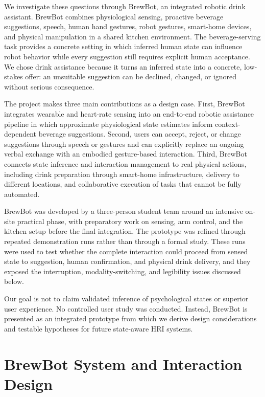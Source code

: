 We investigate these questions through BrewBot, an integrated robotic drink
assistant. BrewBot combines physiological sensing, proactive beverage
suggestions, speech, human hand gestures, robot gestures, smart-home devices,
and physical manipulation in a shared kitchen environment. The beverage-serving
task provides a concrete setting in which inferred human state can influence
robot behavior while every suggestion still requires explicit human acceptance.
We chose drink assistance because it turns an inferred state into a concrete, 
low-stakes offer: an unsuitable suggestion can be declined, changed, or ignored 
without serious consequence.

The project makes three main contributions as a design case. First, BrewBot
integrates wearable and heart-rate sensing into an end-to-end robotic assistance
pipeline in which approximate physiological state estimates inform
context-dependent beverage suggestions. Second, users can accept, reject, or
change suggestions through speech or gestures and can explicitly replace an
ongoing verbal exchange with an embodied gesture-based interaction. Third,
BrewBot connects state inference and interaction management to real physical
actions, including drink preparation through smart-home infrastructure, delivery
to different locations, and collaborative execution of tasks that cannot be
fully automated.

BrewBot was developed by a three-person student team around an intensive
on-site practical phase, with preparatory work on sensing, arm control, and the
kitchen setup before the final integration. The prototype was refined through
repeated demonstration runs rather than through a formal study. These runs were
used to test whether the complete interaction could proceed from sensed state to
suggestion, human confirmation, and physical drink delivery, and they exposed
the interruption, modality-switching, and legibility issues discussed below.

Our goal is not to claim validated inference of psychological states or superior
user experience. No controlled user study was conducted. Instead, BrewBot is
presented as an integrated prototype from which we derive design considerations
and testable hypotheses for future state-aware HRI systems.

\section{BrewBot System and Interaction Design}

